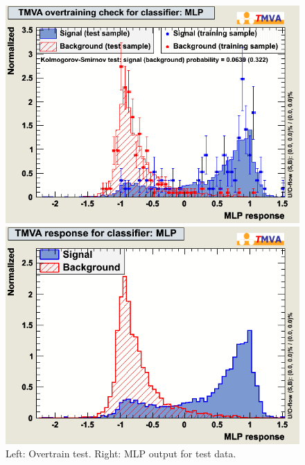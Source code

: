  
\begin{figure}[h]
 \begin{minipage}{7.0cm}
\includegraphics[width=1.0\textwidth]{images/ahOvertrain_MLP.png}
\end{minipage}
\hfill
\begin{minipage}{7.0cm}
\includegraphics[width=1.0\textwidth]{images/ahMva_MLP.png}
\end{minipage}
\begin{minipage}{3.0cm}
\scriptsize
\caption{Left: Overtrain test. Right: MLP output for test data.}
\normalsize
\end{minipage}
\label{fig:mlp}
\end{figure}



